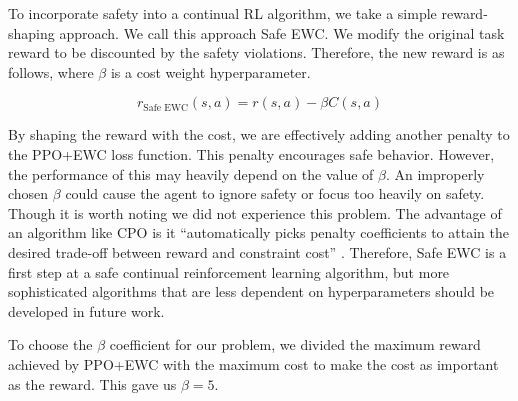 To incorporate safety into a continual RL algorithm, we take a simple reward-shaping approach. We call this approach Safe EWC. We modify the original task reward to be discounted by the safety violations. Therefore, the new reward is as follows, where $\beta$ is a cost weight hyperparameter.

\begin{equation}
    r_{\text{Safe EWC}}(s, a) = r(s, a) - \beta C(s, a)
\end{equation}

By shaping the reward with the cost, we are effectively adding another penalty to the PPO+EWC loss function. This penalty encourages safe behavior. However, the performance of this may heavily depend on the value of $\beta$. An improperly chosen $\beta$ could cause the agent to ignore safety or focus too heavily on safety. Though it is worth noting we did not experience this problem. The advantage of an algorithm like CPO is it ``automatically picks penalty coefficients to attain the desired trade-off between reward and constraint cost'' \cite{achiam2017constrained}. Therefore, Safe EWC is a first step at a safe continual reinforcement learning algorithm, but more sophisticated algorithms that are less dependent on hyperparameters should be developed in future work. 

To choose the $\beta$ coefficient for our problem, we divided the maximum reward achieved by PPO+EWC with the maximum cost to make the cost as important as the reward. This gave us $\beta=5$.
